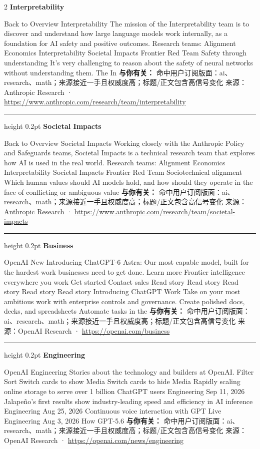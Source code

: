 \documentclass[10.5pt]{ctexart}
\begin{document}
\begin{multicols}{2}
{\large\bfseries Interpretability}\par
Back to Overview Interpretability The mission of the Interpretability team is to discover and understand how large language models work internally, as a foundation for AI safety and positive outcomes. Research teams: Alignment Economics Interpretability Societal Impacts Frontier Red Team Safety through understanding It's very challenging to reason about the safety of neural networks without understanding them. The In
\textbf{与你有关：} 命中用户订阅版面：ai、research、math；来源接近一手且权威度高；标题/正文包含高信号变化
{\footnotesize\color{ormuted} 来源：Anthropic Research · \url{https://www.anthropic.com/research/team/interpretability}}
\vspace{2mm}
\hrule height 0.2pt
\vspace{2mm}
{\large\bfseries Societal Impacts}\par
Back to Overview Societal Impacts Working closely with the Anthropic Policy and Safeguards teams, Societal Impacts is a technical research team that explores how AI is used in the real world. Research teams: Alignment Economics Interpretability Societal Impacts Frontier Red Team Sociotechnical alignment Which human values should AI models hold, and how should they operate in the face of conflicting or ambiguous value
\textbf{与你有关：} 命中用户订阅版面：ai、research、math；来源接近一手且权威度高；标题/正文包含高信号变化
{\footnotesize\color{ormuted} 来源：Anthropic Research · \url{https://www.anthropic.com/research/team/societal-impacts}}
\vspace{2mm}
\hrule height 0.2pt
\vspace{2mm}
{\large\bfseries Business}\par
OpenAI New Introducing ChatGPT-6 Astra: Our most capable model, built for the hardest work businesses need to get done. Learn more Frontier intelligence everywhere you work Get started Contact sales Read story Read story Read story Read story Read story Introducing ChatGPT Work Take on your most ambitious work with enterprise controls and governance. Create polished docs, decks, and spreadsheets Automate tasks in the
\textbf{与你有关：} 命中用户订阅版面：ai、research、math；来源接近一手且权威度高；标题/正文包含高信号变化
{\footnotesize\color{ormuted} 来源：OpenAI Research · \url{https://openai.com/business}}
\vspace{2mm}
\hrule height 0.2pt
\vspace{2mm}
{\large\bfseries Engineering}\par
OpenAI Engineering Stories about the technology and builders at OpenAI. Filter Sort Switch cards to show Media Switch cards to hide Media Rapidly scaling online storage to serve over 1 billion ChatGPT users Engineering Sep 11, 2026 Jalapeño’s first results show industry-leading speed and efficiency in AI inference Engineering Aug 25, 2026 Continuous voice interaction with GPT Live Engineering Aug 3, 2026 How GPT-5.6 
\textbf{与你有关：} 命中用户订阅版面：ai、research、math；来源接近一手且权威度高；标题/正文包含高信号变化
{\footnotesize\color{ormuted} 来源：OpenAI Research · \url{https://openai.com/news/engineering}}
\end{multicols}
\end{document}
